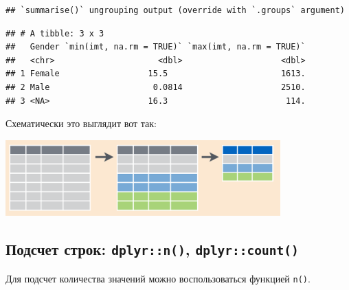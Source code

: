 \documentclass[
]{book}
\newenvironment{Shaded}{\begin{snugshade}}{\end{snugshade}}
\newcommand{\DataTypeTok}[1]{\textcolor[rgb]{0.13,0.29,0.53}{#1}}
\newcommand{\DecValTok}[1]{\textcolor[rgb]{0.00,0.00,0.81}{#1}}
\newcommand{\KeywordTok}[1]{\textcolor[rgb]{0.13,0.29,0.53}{\textbf{#1}}}
\newcommand{\NormalTok}[1]{#1}
\newcommand{\OperatorTok}[1]{\textcolor[rgb]{0.81,0.36,0.00}{\textbf{#1}}}
\newcommand{\OtherTok}[1]{\textcolor[rgb]{0.56,0.35,0.01}{#1}}
\newcommand{\StringTok}[1]{\textcolor[rgb]{0.31,0.60,0.02}{#1}}
\begin{document}
\begin{Shaded}
\end{Shaded}

\begin{verbatim}
## `summarise()` ungrouping output (override with `.groups` argument)
\end{verbatim}

\begin{verbatim}
## # A tibble: 3 x 3
##   Gender `min(imt, na.rm = TRUE)` `max(imt, na.rm = TRUE)`
##   <chr>                     <dbl>                    <dbl>
## 1 Female                  15.5                       1613.
## 2 Male                     0.0814                    2510.
## 3 <NA>                    16.3                        114.
\end{verbatim}

Схематически это выглядит вот так:

\includegraphics[width=4.16667in,height=\textheight]{images/group_by_s.png}

\hypertarget{tidy_count}{%
\subsection{\texorpdfstring{Подсчет строк: \texttt{dplyr::n()}, \texttt{dplyr::count()}}{Подсчет строк: dplyr::n(), dplyr::count()}}\label{tidy_count}}

Для подсчет количества значений можно воспользоваться функцией \texttt{n()}.

\begin{Shaded}
\end{Shaded}
\end{document}
